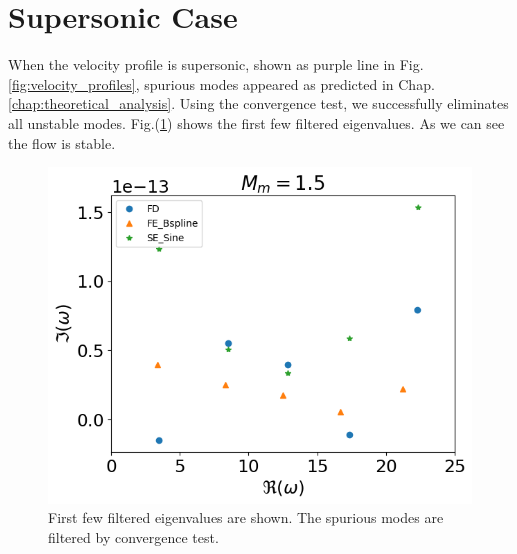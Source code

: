 \section{Supersonic Case}
When the velocity profile is supersonic, shown as purple line in Fig.\ref{fig:velocity_profiles}, spurious modes appeared as predicted in Chap.\ref{chap:theoretical_analysis}. Using the convergence test, we successfully eliminates all unstable modes. Fig.(\ref{fig:supersonic_v}) shows the first few filtered eigenvalues. As we can see the flow is stable.
\begin{figure} [H]
	\centering
	\includegraphics[width=0.7\linewidth]{img/numerical_experiments/supersonic_v}
	\caption{First few filtered eigenvalues are shown. The spurious modes are filtered by convergence test.}
	\label{fig:supersonic_v}
\end{figure}

